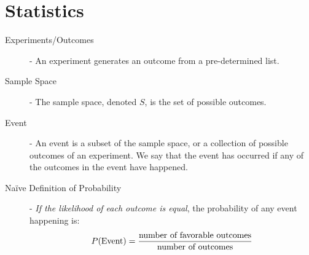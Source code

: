 \documentclass[11pt]{article}
\begin{document}
\section*{Statistics}
\begin{description}
	\item[Experiments/Outcomes] - An experiment generates an outcome from a pre-determined list.
	\item[Sample Space] - The sample space, denoted $S$, is the set of possible outcomes.
	\item[Event] - An event is a subset of the sample space, or a collection of possible outcomes of an experiment. We say that the event has occurred if any of the outcomes in the event have happened.
	\item[Na\"{i}ve Definition of Probability] - \emph{If the likelihood of each outcome is equal}, the probability of any event happening is:
		\[P(\textnormal{Event}) = \frac{\textnormal{number of favorable outcomes}}{\textnormal{number of outcomes}}\]
\end{description}
\end{document}

